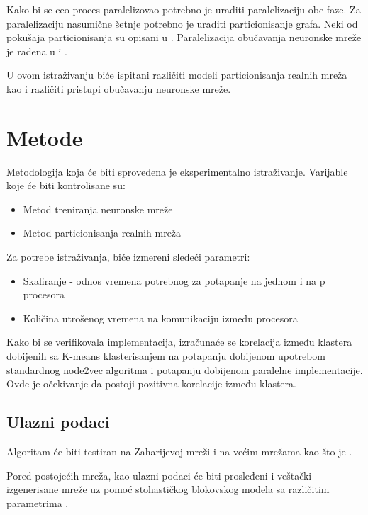 \documentclass[]{amsart}
\begin{document}
Kako bi se ceo proces paralelizovao potrebno je uraditi paralelizaciju obe faze. Za paralelizaciju nasumične šetnje potrebno je uraditi particionisanje grafa. Neki od pokušaja particionisanja su opisani u \cite{lombardo2019actornode2vec}. Paralelizacija obučavanja neuronske mreže je rađena u \cite{gupta2018distributed} i \cite{anil2018large}. 

U ovom istraživanju biće ispitani različiti modeli particionisanja realnih mreža kao i različiti pristupi obučavanju neuronske mreže. 

\section{Metode}
\label{sec:methods}

Metodologija koja će biti sprovedena je eksperimentalno istraživanje. Varijable koje će biti kontrolisane su:

\begin{itemize}
  \item Metod treniranja neuronske mreže 
  \item Metod particionisanja realnih mreža
\end{itemize}

Za potrebe istraživanja, biće izmereni sledeći parametri:

\begin{itemize}
  \item Skaliranje - odnos vremena potrebnog za potapanje na jednom i na p procesora
  \item Količina utrošenog vremena na komunikaciju između procesora 
\end{itemize}

Kako bi se verifikovala implementacija, izračunaće se korelacija između klastera dobijenih sa K-means klasterisanjem na potapanju dobijenom upotrebom standardnog node2vec algoritma i potapanju dobijenom paralelne implementacije. Ovde je očekivanje da postoji pozitivna korelacije između klastera. 



\subsection{Ulazni podaci}
\label{sec:input_data}

Algoritam će biti testiran na Zaharijevoj mreži \cite{zachary1977information} i na većim mrežama kao što je \cite{leskovec2009community}. 

Pored postojećih mreža, kao ulazni podaci će biti prosleđeni i veštački izgenerisane mreže uz pomoć stohastičkog blokovskog modela sa različitim parametrima \cite{abbe2018community}.




\end{document}
